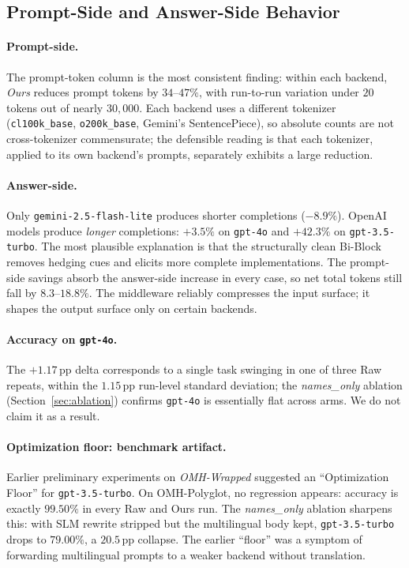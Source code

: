 \documentclass[11pt,a4paper,twocolumn]{article}
\begin{document}
\subsection{Prompt-Side and Answer-Side Behavior}
\label{sec:answer-side}
\paragraph{Prompt-side.} The prompt-token column is the most consistent finding: within each backend, \textit{Ours} reduces prompt tokens by $34$--$47\%$, with run-to-run variation under $20$ tokens out of nearly $30{,}000$. Each backend uses a different tokenizer (\texttt{cl100k\_base}, \texttt{o200k\_base}, Gemini's SentencePiece), so absolute counts are not cross-tokenizer commensurate; the defensible reading is that each tokenizer, applied to its own backend's prompts, separately exhibits a large reduction.

\paragraph{Answer-side.} Only \texttt{gemini-2.5-flash-lite} produces shorter completions ($-8.9\%$). OpenAI models produce \textit{longer} completions: $+3.5\%$ on \texttt{gpt-4o} and $+42.3\%$ on \texttt{gpt-3.5-turbo}. The most plausible explanation is that the structurally clean Bi-Block removes hedging cues and elicits more complete implementations. The prompt-side savings absorb the answer-side increase in every case, so net total tokens still fall by $8.3$--$18.8\%$. The middleware reliably compresses the input surface; it shapes the output surface only on certain backends.

\paragraph{Accuracy on \texttt{gpt-4o}.} The $+1.17$\,pp delta corresponds to a single task swinging in one of three Raw repeats, within the $1.15$\,pp run-level standard deviation; the \textit{names\_only} ablation (Section~\ref{sec:ablation}) confirms \texttt{gpt-4o} is essentially flat across arms. We do not claim it as a result.

\paragraph{Optimization floor: benchmark artifact.} Earlier preliminary experiments on \textit{OMH-Wrapped} suggested an ``Optimization Floor'' for \texttt{gpt-3.5-turbo}. On OMH-Polyglot, no regression appears: accuracy is exactly $99.50\%$ in every Raw and Ours run. The \textit{names\_only} ablation sharpens this: with SLM rewrite stripped but the multilingual body kept, \texttt{gpt-3.5-turbo} drops to $79.00\%$, a $20.5$\,pp collapse. The earlier ``floor'' was a symptom of forwarding multilingual prompts to a weaker backend without translation.
\end{document}
